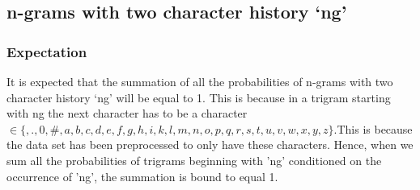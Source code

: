 \documentclass[12pt]{article}
\begin{document}
\subsection{n-grams with two character history `ng'}
\subsubsection{Expectation}
It is expected that the summation of all the probabilities of n-grams with two character history `ng' will be equal to 1. This is because in a trigram starting with ng the next character has to be a character $\in \{ ,.,0,\#,a,b,c,d,e,f,g,h,i,k,l,m,n,o,p,q,r,s,t,u,v,w,x,y,z\}. $This is because the data set has been preprocessed to only have these characters. Hence, when we sum all the probabilities of trigrams beginning with 'ng' conditioned on the occurrence of 'ng', the summation is bound to equal 1.  \\
\end{document}
